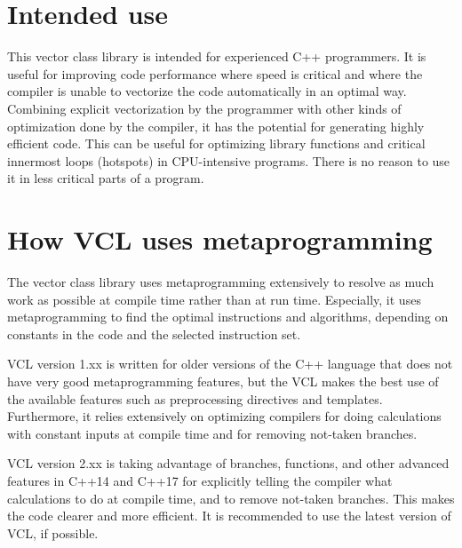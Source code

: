 \documentclass[vcl_manual.tex]{subfiles}
\begin{document}
\section{Intended use} \label{IntendedUse}
This vector class library is intended for experienced C++ programmers. It is useful for improving code performance where speed is critical and where the compiler is unable to vectorize the code automatically in an optimal way. Combining explicit vectorization by the programmer with other kinds of optimization done by the compiler, it has the potential for generating highly efficient code. This can be useful for optimizing library functions and critical innermost loops (hotspots) in CPU-intensive programs. There is no reason to use it in less critical parts of a program.

\section{How VCL uses metaprogramming} \label{HowVCLUsesMetaprogramming}
The vector class library uses metaprogramming extensively to resolve as much work as possible at compile time rather than at run time. Especially, it uses metaprogramming to find the optimal instructions and algorithms, depending on constants in the code and the selected instruction set.

VCL version 1.xx is written for older versions of the C++ language that does not have very good metaprogramming features, but the VCL makes the best use of the available features such as preprocessing directives and templates. Furthermore, it relies extensively on optimizing compilers for  doing calculations with constant inputs at compile time and for removing not-taken branches.

VCL version 2.xx is taking advantage of  branches,  functions, and other advanced features in 
C++14 and C++17 for explicitly telling the compiler what calculations to do at compile time, and to remove not-taken branches. This makes the code clearer and more efficient. It is recommended to use the latest version of VCL, if possible.
\end{document}
